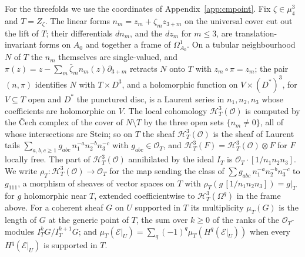 For the threefolds we use the coordinates of Appendix~\ref{app:cmpoint}. Fix $\zeta\in\mu_{4}^{3}$ and $T=Z_{\zeta}$. The linear forms $n_{m}=z_{m}+\zeta_{m}z_{3+m}$ on the universal cover cut out the lift of $T$; their differentials $dn_{m}$, and the $dz_{m}$ for $m\le3$, are translation-invariant forms on $A_{0}$ and together a frame of $\Omega^{1}_{A_{0}}$. On a tubular neighbourhood $N$ of $T$ the $n_{m}$ themselves are single-valued, and $\pi(z)=z-\sum_{m}\bar\zeta_{m}n_{m}(z)\partial_{3+m}$ retracts $N$ onto $T$ with $z_{m}\circ\pi=z_{m}$; the pair $(n,\pi)$ identifies $N$ with $T\times D^{3}$, and a holomorphic function on $V\times(D^{*})^{3}$, for $V\subseteq T$ open and $D^{*}$ the punctured disc, is a Laurent series in $n_{1},n_{2},n_{3}$ whose coefficients are holomorphic on $V$. The local cohomology $\mathcal{H}^{3}_{T}(\mathcal{O})$ is computed by the \v{C}ech complex of the cover of $N\setminus T$ by the three open sets $\{n_{m}\ne0\}$, all of whose intersections are Stein; so on $T$ the sheaf $\mathcal{H}^{3}_{T}(\mathcal{O})$ is the sheaf of Laurent tails $\sum_{a,b,c\ge1}g_{abc}\,n_{1}^{-a}n_{2}^{-b}n_{3}^{-c}$ with $g_{abc}\in\mathcal{O}_{T}$, and $\mathcal{H}^{3}_{T}(F)=\mathcal{H}^{3}_{T}(\mathcal{O})\otimes F$ for $F$ locally free. The part of $\mathcal{H}^{3}_{T}(\mathcal{O})$ annihilated by the ideal $I_{T}$ is $\mathcal{O}_{T}\cdot[1/n_{1}n_{2}n_{3}]$. We write $\rho_{T}\colon\mathcal{H}^{3}_{T}(\mathcal{O})\to\mathcal{O}_{T}$ for the map sending the class of $\sum g_{abc}\,n_{1}^{-a}n_{2}^{-b}n_{3}^{-c}$ to $g_{111}$, a morphism of sheaves of vector spaces on $T$ with $\rho_{T}(g\,[1/n_{1}n_{2}n_{3}])=g|_{T}$ for $g$ holomorphic near $T$, extended coefficientwise to $\mathcal{H}^{3}_{T}(\Omega^{q})$ in the frame above. For a coherent sheaf $G$ on $U$ supported in $T$ its multiplicity $\mu_{T}(G)$ is the length of $G$ at the generic point of $T$, the sum over $k\ge0$ of the ranks of the $\mathcal{O}_{T}$-modules $I_{T}^{k}G/I_{T}^{k+1}G$; and $\mu_{T}(\mathcal{E}|_{U})=\sum_{q}(-1)^{q}\mu_{T}(H^{q}(\mathcal{E}|_{U}))$ when every $H^{q}(\mathcal{E}|_{U})$ is supported in $T$.

